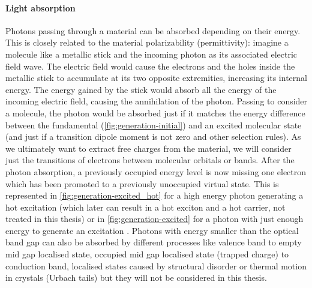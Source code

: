 		\paragraph{Light absorption}
		Photons passing through a material can be absorbed depending on their energy.
		This is closely related to the material polarizability (permittivity): imagine a molecule like a metallic stick and the incoming photon as its associated electric field wave.
		The electric field would cause the electrons and the holes inside the metallic stick to accumulate at its two opposite extremities, increasing its internal energy.
		The energy gained by the stick would absorb all the energy of the incoming electric field, causing the annihilation of the photon.
		Passing to consider a molecule, the photon would be absorbed just if it matches the energy difference between the fundamental (\cref{fig:generation-initial}) and an excited molecular state (and just if a transition dipole moment is not zero and other selection rules).
		As we ultimately want to extract free charges from the material, we will consider just the transitions of electrons between molecular orbitals or bands.
		After the photon absorption, a previously occupied energy level is now missing one electron which has been promoted to a previously unoccupied virtual state.
		This is represented in \cref{fig:generation-excited_hot} for a high energy photon generating a hot excitation  (which later can result in a hot exciton and a hot carrier, not treated in this thesis) or in \cref{fig:generation-excited} for a photon with just enough energy to generate an excitation .
		Photons with energy smaller than the optical band gap can also be absorbed by different processes like valence band to empty mid gap localised state, occupied mid gap localised state (trapped charge) to conduction band, localised states caused by structural disorder or thermal motion in crystals (Urbach tails) but they will not be considered in this thesis.
		
